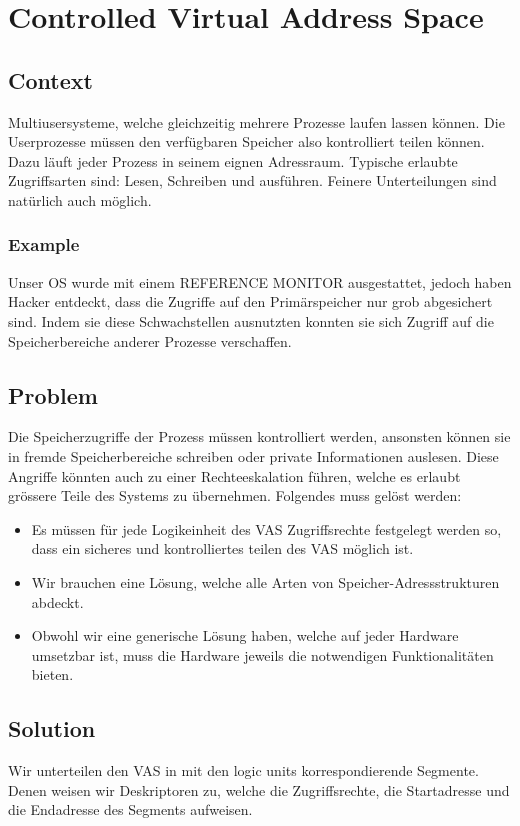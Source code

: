\chapter{Controlled Virtual Address Space}

\section{Context}
Multiusersysteme, welche gleichzeitig mehrere Prozesse laufen lassen können. Die Userprozesse müssen den verfügbaren Speicher also kontrolliert teilen können. Dazu läuft jeder Prozess in seinem eignen Adressraum. Typische erlaubte Zugriffsarten sind: Lesen, Schreiben und ausführen. Feinere Unterteilungen sind natürlich auch möglich.

\subsection{Example}
Unser OS wurde mit einem REFERENCE MONITOR ausgestattet, jedoch haben Hacker entdeckt, dass die Zugriffe auf den Primärspeicher nur grob abgesichert sind. Indem sie diese Schwachstellen ausnutzten konnten sie sich Zugriff auf die Speicherbereiche anderer Prozesse verschaffen.

\section{Problem}
Die Speicherzugriffe der Prozess müssen kontrolliert werden, ansonsten können sie in fremde Speicherbereiche schreiben oder private Informationen auslesen. Diese Angriffe könnten auch zu einer Rechteeskalation führen, welche es erlaubt grössere Teile des Systems zu übernehmen. Folgendes muss gelöst werden:
\begin{itemize}
  \item Es müssen für jede Logikeinheit des VAS Zugriffsrechte festgelegt werden so, dass ein sicheres und kontrolliertes teilen des VAS möglich ist.
  \item Wir brauchen eine Lösung, welche alle Arten von Speicher-Adressstrukturen abdeckt.
  \item Obwohl wir eine generische Lösung haben, welche auf jeder Hardware umsetzbar ist, muss die Hardware jeweils die notwendigen Funktionalitäten bieten.
\end{itemize}


\section{Solution}
Wir unterteilen den VAS in mit den logic units korrespondierende Segmente. Denen weisen wir Deskriptoren zu, welche die Zugriffsrechte, die Startadresse und die Endadresse des Segments aufweisen.

